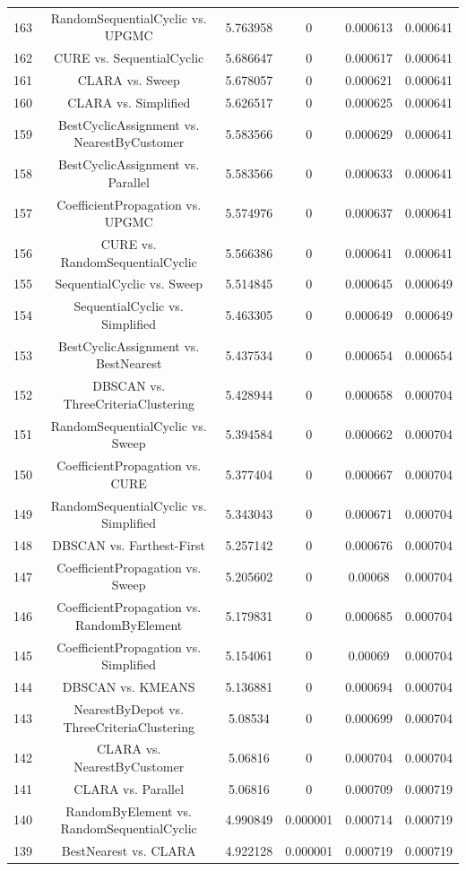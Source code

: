 \documentclass[a4paper,10pt]{article}
\begin{document}
\begin{landscape}
\begin{table}[!htp]
\begin{tabular}{cccccc}
163&RandomSequentialCyclic vs. UPGMC&5.763958&0&0.000613&0.000641\\
162&CURE vs. SequentialCyclic&5.686647&0&0.000617&0.000641\\
161&CLARA vs. Sweep&5.678057&0&0.000621&0.000641\\
160&CLARA vs. Simplified&5.626517&0&0.000625&0.000641\\
159&BestCyclicAssignment vs. NearestByCustomer&5.583566&0&0.000629&0.000641\\
158&BestCyclicAssignment vs. Parallel&5.583566&0&0.000633&0.000641\\
157&CoefficientPropagation vs. UPGMC&5.574976&0&0.000637&0.000641\\
156&CURE vs. RandomSequentialCyclic&5.566386&0&0.000641&0.000641\\
155&SequentialCyclic vs. Sweep&5.514845&0&0.000645&0.000649\\
154&SequentialCyclic vs. Simplified&5.463305&0&0.000649&0.000649\\
153&BestCyclicAssignment vs. BestNearest&5.437534&0&0.000654&0.000654\\
152&DBSCAN vs. ThreeCriteriaClustering&5.428944&0&0.000658&0.000704\\
151&RandomSequentialCyclic vs. Sweep&5.394584&0&0.000662&0.000704\\
150&CoefficientPropagation vs. CURE&5.377404&0&0.000667&0.000704\\
149&RandomSequentialCyclic vs. Simplified&5.343043&0&0.000671&0.000704\\
148&DBSCAN vs. Farthest-First&5.257142&0&0.000676&0.000704\\
147&CoefficientPropagation vs. Sweep&5.205602&0&0.00068&0.000704\\
146&CoefficientPropagation vs. RandomByElement&5.179831&0&0.000685&0.000704\\
145&CoefficientPropagation vs. Simplified&5.154061&0&0.00069&0.000704\\
144&DBSCAN vs. KMEANS&5.136881&0&0.000694&0.000704\\
143&NearestByDepot vs. ThreeCriteriaClustering&5.08534&0&0.000699&0.000704\\
142&CLARA vs. NearestByCustomer&5.06816&0&0.000704&0.000704\\
141&CLARA vs. Parallel&5.06816&0&0.000709&0.000719\\
140&RandomByElement vs. RandomSequentialCyclic&4.990849&0.000001&0.000714&0.000719\\
139&BestNearest vs. CLARA&4.922128&0.000001&0.000719&0.000719\\

\end{tabular}
\end{table}
\end{landscape}
\end{document}
